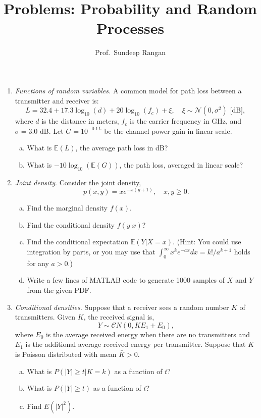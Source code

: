 \documentclass[11pt]{article}
\def\Exp{\mathbb{E}}
\begin{document}
\title{Problems:  Probability and Random Processes}
\author{Prof.\ Sundeep Rangan}
\date{}

\maketitle

\begin{enumerate}

\item \emph{Functions of random variables.}
A common model for path loss between a transmitter and receiver is:
\[
    L = 32.4 + 17.3 \log_{10}(d) + 20\log_{10}(f_c)+ \xi, \quad \xi \sim {\mathcal N}(0,\sigma^2) \mbox{ [dB], }
\]
where $d$ is the distance in meters, $f_c$ is the carrier frequency
in GHz, and $\sigma=3.0$ dB. Let $G= 10^{-0.1L}$ be the channel power
gain in linear scale.
\begin{enumerate}[(a)]
\item What is $\Exp(L)$, the average path loss in dB?
\item What is $-10\log_{10}(\Exp(G))$, the path loss, averaged in linear scale?

\end{enumerate}



\item \emph{Joint density}.  Consider the joint density,
\[
    p(x,y) = xe^{-x(y+1)}, \quad x,y \geq 0.
\]
\begin{enumerate}[(a)]
  \item Find the marginal density $f(x)$.
  \item Find the conditional density $f(y|x)$?
  \item Find the conditional expectation $\Exp(Y|X=x)$.
(Hint: You could use integration by parts, or
you may use that
$\int_0^\infty x^k e^{-ax}dx = {k!}/{a^{k+1}}$
holds for any $a > 0$.)

\item Write a few lines of MATLAB code to generate 1000 samples of
$X$ and $Y$ from the given PDF.
\end{enumerate}

\item \emph{Conditional densities.}  Suppose that a receiver
sees a random number $K$ of transmitters.  
Given $K$, the received signal is,
\[
    Y \sim {\mathcal CN}(0, KE_1 + E_0),
\]
where $E_0$ is the average received energy when there are no transmitters
and $E_1$ is the additional average received energy per transmitter. 
Suppose that $K$ is Poisson distributed with mean $\bar{K}>0$.
\begin{enumerate}[(a)]
\item What is $P(|Y| \geq t|K=k)$ as a function of $t$?
\item What is $P(|Y| \geq t)$ as a function of $t$?
\item Find $E(|Y|^2)$.
\end{enumerate}


\end{enumerate}
\end{document}

